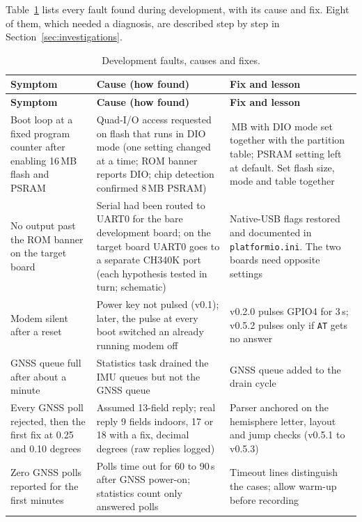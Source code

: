 Table~\ref{tab:faults} lists every fault found during development, with its cause and fix. Eight of them, which needed a diagnosis, are described step by step in Section~\ref{sec:investigations}.

\begin{longtable}{|>{\raggedright\arraybackslash}p{3.6cm}|>{\raggedright\arraybackslash}p{5.0cm}|>{\raggedright\arraybackslash}p{4.9cm}|}
\caption[Development faults, causes and fixes]{Development faults, causes and fixes.}
\label{tab:faults}\\
\hline
\textbf{Symptom} & \textbf{Cause (how found)} & \textbf{Fix and lesson} \\ \hline
\endfirsthead
\hline
\textbf{Symptom} & \textbf{Cause (how found)} & \textbf{Fix and lesson} \\ \hline
\endhead
Boot loop at a fixed program counter after enabling 16\,MB flash and PSRAM & Quad-I/O access requested on flash that runs in DIO mode (one setting changed at a time; ROM banner reports DIO; chip detection confirmed 8\,MB PSRAM) & 16\,MB with DIO mode set together with the partition table; PSRAM setting left at default. Set flash size, mode and table together \\ \hline
No output past the ROM banner on the target board & Serial had been routed to UART0 for the bare development board; on the target board UART0 goes to a separate CH340K port (each hypothesis tested in turn; schematic) & Native-USB flags restored and documented in \texttt{platformio.ini}. The two boards need opposite settings \\ \hline
Modem silent after a reset & Power key not pulsed (v0.1); later, the pulse at every boot switched an already running modem off & v0.2.0 pulses GPIO4 for 3\,s; v0.5.2 pulses only if \texttt{AT} gets no answer \\ \hline
GNSS queue full after about a minute & Statistics task drained the IMU queues but not the GNSS queue & GNSS queue added to the drain cycle \\ \hline
Every GNSS poll rejected, then the first fix at 0.25 and 0.10 degrees & Assumed 13-field reply; real reply 9 fields indoors, 17 or 18 with a fix, decimal degrees (raw replies logged) & Parser anchored on the hemisphere letter, layout and jump checks (v0.5.1 to v0.5.3) \\ \hline
Zero GNSS polls reported for the first minutes & Polls time out for 60 to 90\,s after GNSS power-on; statistics count only answered polls & Timeout lines distinguish the cases; allow warm-up before recording \\ \hline

\end{longtable}
